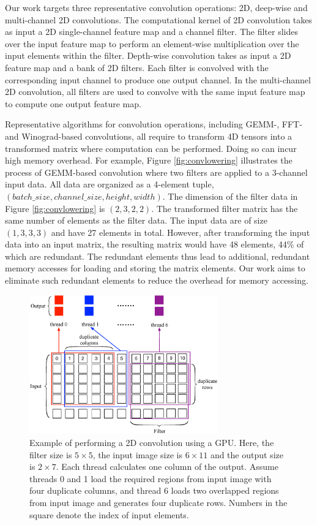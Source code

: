 Our work targets three representative convolution operations: 2D, deep-wise and multi-channel 2D convolutions. The computational kernel of 2D convolution takes
as input a 2D single-channel feature map and a channel filter. The filter slides over the input feature map to perform an element-wise
multiplication over the input elements within the filter. Depth-wise convolution takes as input a 2D feature map and a bank of 2D filters.
Each filter is convolved with the corresponding input channel to produce one output channel. In the multi-channel 2D convolution, all filters are used to convolve with the same input feature map to compute one output feature map.



Representative algorithms for convolution operations, including GEMM-, FFT- and Winograd-based convolutions, all require to transform 4D
tensors into a transformed matrix where computation can be performed. Doing so can incur high memory overhead. For example, Figure
\ref{fig:convlowering} illustrates the process of GEMM-based convolution where two filters are applied to a 3-channel input data. All data
are organized as a 4-element tuple, $(batch\_size, channel\_size, height, width)$. The dimension of the filter data in Figure
\ref{fig:convlowering} is $(2, 3, 2, 2)$. The transformed filter matrix has the same number of elements as the filter data. The input data
are of size $(1, 3, 3, 3)$ and have 27 elements in total. However, after transforming the input data into an input matrix, the resulting
matrix would have 48 elements, 44\% of which are redundant. The redundant elements thus lead to additional, redundant memory accesses for
loading and storing the matrix elements. Our work aims to eliminate such redundant elements to reduce the overhead for memory accessing.


\begin{figure}[t!]
\centering
  \includegraphics[width=\columnwidth,height=6cm]{./figure/twostrategies.eps}
  \caption{Example of performing a 2D convolution using a GPU. Here, the filter size is $5 \times 5$, the input image size is $6 \times 11$
  and the output size is $2 \times 7$. Each thread calculates one column of the output. Assume threads 0 and 1 load the required regions from input
  image with four duplicate columns, and thread 6 loads two overlapped regions from input image and generates four duplicate rows. Numbers in
  the square denote the index of input elements.}
  \label{fig:twostrategies}
\end{figure}
